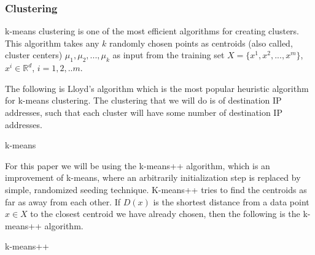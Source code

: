 \documentclass[12pt,oneside,a4paper]{article}
\begin{document}
\subsubsection{Clustering} \label{subsec:Clustering}

k-means\cite{k-means-clustering} clustering is one of the most efficient algorithms for creating clusters. This algorithm takes any $k$ randomly chosen points as centroids (also called, cluster centers) $\mu_{1}, \mu_{2}, ..., \mu_{k}$ as input from the training set $X = \{x^{1}, x^{2}, ..., x^{m}\}$, $x^{i} \in \mathbb{R}^d$, $i= {1,2, ..m}$.

The following is Lloyd's algorithm which is the most popular heuristic algorithm for k-means clustering. The clustering that we will do is of destination IP addresses, such that each cluster will have some number of destination IP addresses.

\begin{algorithm}[H]
\caption{k-means}\label{k-means}
\begin{algorithmic}[1]
  \Repeat
\end{algorithmic}
\end{algorithm}

For this paper we will be using the k-means++ algorithm, which is an improvement of k-means, where an arbitrarily initialization step is replaced by simple, randomized seeding technique. K-means++ tries to find the centroids as far as away from each other. If $D(x)$ is the shortest distance from a data point $x \in X$ to the closest centroid we have already chosen, then the following is the k-means++ algorithm\cite{k-means++}.

\begin{algorithm}[H]
\caption{k-means++}\label{k-means++}
\begin{algorithmic}[1]
\end{algorithmic}
\end{algorithm}
\end{document}
